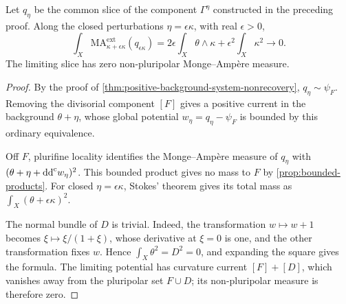 \begin{proposition}\label{prop:nonrecovery-zero-residual-volume}
Let $q_\eta$ be the common slice of the component $\Gamma^\eta$ constructed in the preceding proof. Along the closed perturbations $\eta=\epsilon\kappa$, with real $\epsilon>0$,
\[
 \int_X\mathrm{MA}^{\mathrm{ext}}_{\kappa+\epsilon\kappa}(q_{\epsilon\kappa})
 =2\epsilon\int_X\theta\wedge\kappa
                  +\epsilon^2\int_X\kappa^2\longrightarrow0.
\]
The limiting slice has zero non-pluripolar Monge--Amp\`ere measure.
\end{proposition}
\begin{proof}
By the proof of \cref{thm:positive-background-system-nonrecovery}, $q_\eta\sim\psi_F$. Removing the divisorial component $[F]$ gives a positive current in the background $\theta+\eta$, whose global potential $w_\eta=q_\eta-\psi_F$ is bounded by this ordinary equivalence.

Off $F$, plurifine locality identifies the Monge--Amp\`ere measure of $q_\eta$ with $(\theta+\eta+\mathrm{dd}^{\mathrm{c}} w_\eta)^2$. This bounded product gives no mass to $F$ by \cref{prop:bounded-products}. For closed $\eta=\epsilon\kappa$, Stokes' theorem gives its total mass as $\int_X(\theta+\epsilon\kappa)^2$.

The normal bundle of $D$ is trivial. Indeed, the transformation $w\mapsto w+1$ becomes $\xi\mapsto\xi/(1+\xi)$, whose derivative at $\xi=0$ is one, and the other transformation fixes $w$. Hence $\int_X\theta^2=D^2=0$, and expanding the square gives the formula. The limiting potential has curvature current $[F]+[D]$, which vanishes away from the pluripolar set $F\cup D$; its non-pluripolar measure is therefore zero.
\end{proof}

